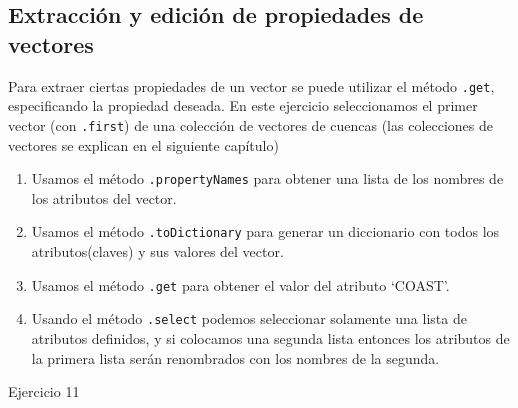 \documentclass[
  12pt,
  letterpaper,
  twoside]{book}
\providecommand{\tightlist}{%
  \setlength{\itemsep}{0pt}\setlength{\parskip}{0pt}}
\begin{document}
\hypertarget{extracciuxf3n-y-ediciuxf3n-de-propiedades-de-vectores}{%
\subsection{Extracción y edición de propiedades de vectores}\label{extracciuxf3n-y-ediciuxf3n-de-propiedades-de-vectores}}

Para extraer ciertas propiedades de un vector se puede utilizar el método \texttt{.get}, especificando la propiedad deseada. En este ejercicio seleccionamos el primer vector (con \texttt{.first}) de una colección de vectores de cuencas (las colecciones de vectores se explican en el siguiente capítulo)

\begin{enumerate}
\def\labelenumi{\arabic{enumi}.}
\tightlist
\item
  Usamos el método \texttt{.propertyNames} para obtener una lista de los nombres de los atributos del vector.
\item
  Usamos el método \texttt{.toDictionary} para generar un diccionario con todos los atributos(claves) y sus valores del vector.
\item
  Usamos el método \texttt{.get} para obtener el valor del atributo `COAST'.
\item
  Usando el método \texttt{.select} podemos seleccionar solamente una lista de atributos definidos, y si colocamos una segunda lista entonces los atributos de la primera lista serán renombrados con los nombres de la segunda.
\end{enumerate}

Ejercicio 11
\end{document}

